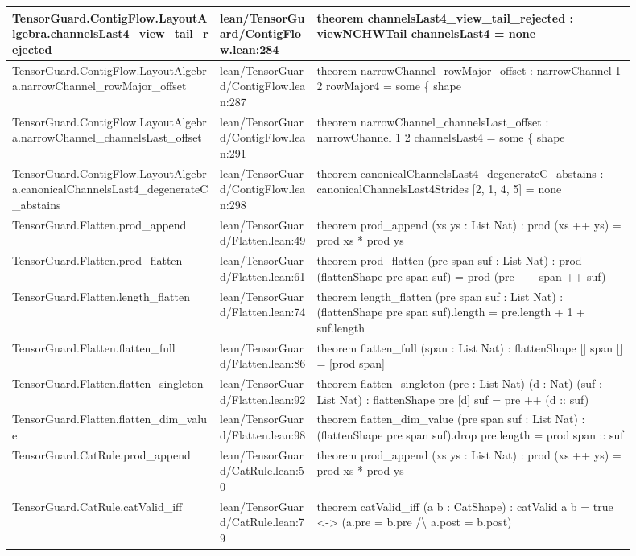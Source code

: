 \documentclass[10pt]{article}
\begin{document}
\begin{longtable}{|p{0.30\linewidth}|p{0.14\linewidth}|p{0.46\linewidth}|}
\hline
TensorGuard.ContigFlow.LayoutAlgebra.channelsLast4\_view\_tail\_rejected & lean/TensorGuard/ContigFlow.lean:284 & theorem channelsLast4\_view\_tail\_rejected : viewNCHWTail channelsLast4 = none \\
\hline
TensorGuard.ContigFlow.LayoutAlgebra.narrowChannel\_rowMajor\_offset & lean/TensorGuard/ContigFlow.lean:287 & theorem narrowChannel\_rowMajor\_offset : narrowChannel 1 2 rowMajor4 = some \{ shape \\
\hline
TensorGuard.ContigFlow.LayoutAlgebra.narrowChannel\_channelsLast\_offset & lean/TensorGuard/ContigFlow.lean:291 & theorem narrowChannel\_channelsLast\_offset : narrowChannel 1 2 channelsLast4 = some \{ shape \\
\hline
TensorGuard.ContigFlow.LayoutAlgebra.canonicalChannelsLast4\_degenerateC\_abstains & lean/TensorGuard/ContigFlow.lean:298 & theorem canonicalChannelsLast4\_degenerateC\_abstains : canonicalChannelsLast4Strides [2, 1, 4, 5] = none \\
\hline
TensorGuard.Flatten.prod\_append & lean/TensorGuard/Flatten.lean:49 & theorem prod\_append (xs ys : List Nat) : prod (xs ++ ys) = prod xs * prod ys \\
\hline
TensorGuard.Flatten.prod\_flatten & lean/TensorGuard/Flatten.lean:61 & theorem prod\_flatten (pre span suf : List Nat) : prod (flattenShape pre span suf) = prod (pre ++ span ++ suf) \\
\hline
TensorGuard.Flatten.length\_flatten & lean/TensorGuard/Flatten.lean:74 & theorem length\_flatten (pre span suf : List Nat) : (flattenShape pre span suf).length = pre.length + 1 + suf.length \\
\hline
TensorGuard.Flatten.flatten\_full & lean/TensorGuard/Flatten.lean:86 & theorem flatten\_full (span : List Nat) : flattenShape [] span [] = [prod span] \\
\hline
TensorGuard.Flatten.flatten\_singleton & lean/TensorGuard/Flatten.lean:92 & theorem flatten\_singleton (pre : List Nat) (d : Nat) (suf : List Nat) : flattenShape pre [d] suf = pre ++ (d :: suf) \\
\hline
TensorGuard.Flatten.flatten\_dim\_value & lean/TensorGuard/Flatten.lean:98 & theorem flatten\_dim\_value (pre span suf : List Nat) : (flattenShape pre span suf).drop pre.length = prod span :: suf \\
\hline
TensorGuard.CatRule.prod\_append & lean/TensorGuard/CatRule.lean:50 & theorem prod\_append (xs ys : List Nat) : prod (xs ++ ys) = prod xs * prod ys \\
\hline
TensorGuard.CatRule.catValid\_iff & lean/TensorGuard/CatRule.lean:79 & theorem catValid\_iff (a b : CatShape) : catValid a b = true <-> (a.pre = b.pre /\textbackslash{} a.post = b.post) \\

\end{longtable}
\end{document}

